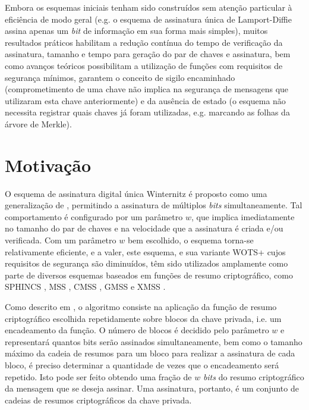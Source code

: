 \documentclass[12pt]{article}
\begin{document}
Embora os esquemas iniciais tenham sido construídos sem atenção particular à
eficiência de modo geral (e.g. o esquema de assinatura única de Lamport-Diffie
\cite{Lamport1979} assina apenas um \emph{bit} de informação em sua forma mais
simples), muitos resultados práticos habilitam a redução contínua do tempo de
verificação da assinatura, tamanho e tempo para geração do par de chaves e
assinatura, bem como avanços teóricos possibilitam a utilização de funções com
requisitos de segurança mínimos, garantem o conceito de sigilo encaminhado
\cite{Buchmann:2011:XPF:2184003.2184011} (comprometimento de uma chave não
implica na segurança de mensagens que utilizaram esta chave anteriormente) e da
ausência de estado \cite{Bernstein2015} (o esquema não necessita registrar
quais chaves já foram utilizadas, e.g. marcando as folhas da árvore de Merkle).

\section{Motivação}

O esquema de assinatura digital única Winternitz é proposto como uma
generalização de \cite{Lamport1979}, permitindo a assinatura de múltiplos
\emph{bits} simultaneamente. Tal comportamento é configurado por um parâmetro
$w$, que implica imediatamente no tamanho do par de chaves e na velocidade que
a assinatura é criada e/ou verificada. Com um parâmetro $w$ bem escolhido, o
esquema torna-se relativamente eficiente, e a valer, este esquema, e sua
variante WOTS+ \cite{cryptoeprint:2017:965} cujos requisitos de segurança são
diminuídos, têm sido utilizados amplamente como parte de diversos esquemas
baseados em funções de resumo criptográfico, como SPHINCS \cite{Bernstein2015},
MSS \cite{Merkle:1989:CDS:118209.118230}, CMSS \cite{Buchmann2006}, GMSS
\cite{Buchmann2007} e XMSS \cite{Buchmann:2011:XPF:2184003.2184011}.

Como descrito em \cite{Bernstein:2008:PQC:1522375}, o algoritmo consiste na
aplicação da função de resumo criptográfico escolhida repetidamente sobre
blocos da chave privada, i.e. um encadeamento da função. O número de blocos
é decidido pelo parâmetro $w$ e representará quantos bits serão assinados
simultaneamente, bem como o tamanho máximo da cadeia de resumos para um
bloco para realizar a assinatura de cada bloco, é preciso determinar a
quantidade de vezes que o encadeamento será repetido. Isto pode ser feito
obtendo uma fração de $w$ \emph{bits} do resumo criptográfico da mensagem
que se deseja assinar. Uma assinatura, portanto, é um conjunto de cadeias
de resumos criptográficos da chave privada.
\end{document}
